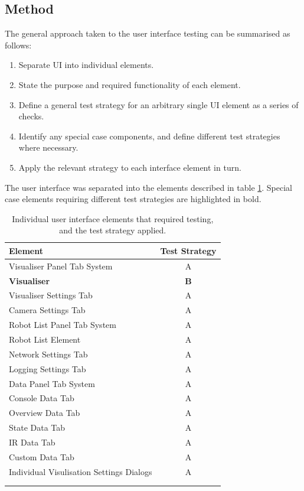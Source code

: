 \subsection{Method}
The general approach taken to the user interface testing can be summarised as follows:

\begin{enumerate}
 \item Separate UI into individual elements.
 \item State the purpose and required functionality of each element.
 \item Define a general test strategy for an arbitrary single UI element as a series of checks.
 \item Identify any special case components, and define different test strategies where necessary.
 \item Apply the relevant strategy to each interface element in turn.
\end{enumerate}

\vspace{0.5cm}

\noindent The user interface was separated into the elements described in table \ref{tab:UserInterfaceElements}. Special case elements requiring different test strategies are highlighted in bold.

\begin{longtable}{ l c }
 Element & Test Strategy\\
 \hline
 Visualiser Panel Tab System & A \\
 \textbf{Visualiser} & \textbf{B} \\
 Visualiser Settings Tab & A \\
 Camera Settings Tab & A \\
 Robot List Panel Tab System & A \\
 Robot List Element & A \\
 Network Settings Tab & A \\
 Logging Settings Tab & A \\
 Data Panel Tab System & A \\
 Console Data Tab & A \\
 Overview Data Tab & A \\
 State Data Tab & A \\
 IR Data Tab & A \\
 Custom Data Tab & A \\
 Individual Visulisation Settings Dialogs & A \\
 \bottomrule
 \caption[User Interface Elements for Testing]{Individual user interface elements that required testing, and the test strategy applied.}\\
 \label{tab:UserInterfaceElements}
\end{longtable}

